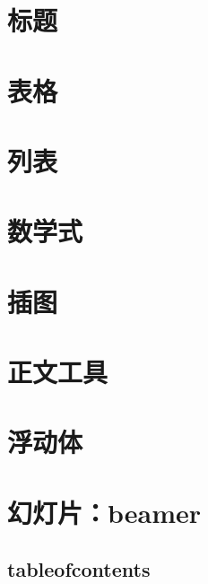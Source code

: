 \section{标题}


\section{表格}


\section{列表}


\section{数学式}


\section{插图}


\section{正文工具}


\section{浮动体}


\section{幻灯片：beamer}

\subsection{tableofcontents}

